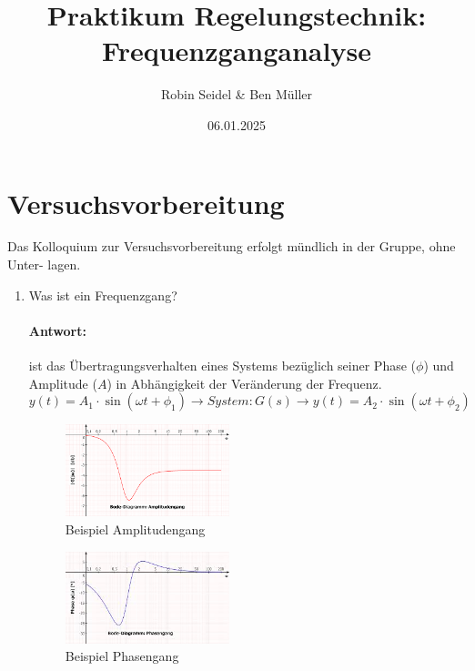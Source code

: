 \documentclass[12pt, a4paper]{article}
\title{\vspace{-0.5cm}Praktikum Regelungstechnik: Frequenzganganalyse\vspace{-0.5cm}}
\author{Robin Seidel \& Ben Müller}
\date{06.01.2025}
\begin{document}
\maketitle

\newpage
\section*{Versuchsvorbereitung}
Das Kolloquium zur Versuchsvorbereitung erfolgt mündlich in der Gruppe, ohne Unter-
lagen.

\begin{enumerate}
    \item Was ist ein Frequenzgang?
    \vspace{-16pt}\paragraph{Antwort:} ist das Übertragungsverhalten eines Systems bezüglich seiner Phase ($\phi$) und Amplitude ($A$) in Abhängigkeit der Veränderung der Frequenz.
    \[ y(t) = A_{1} \cdot \sin(\omega t + \phi_{1})  \rightarrow System: G(s) \rightarrow y(t) = A_{2} \cdot \sin(\omega t + \phi_{2})\]
    \begin{paracol}{2}
        \begin{figure}[H]
            \centering
            \includegraphics[width=0.45\textwidth]{amplitudengang.png}
            \caption{Beispiel Amplitudengang}
        \end{figure}
    \switchcolumn
        \begin{figure}[H]
            \centering
            \includegraphics[width=0.45\textwidth]{phasengang.jpg}
            \caption{Beispiel Phasengang}
        \end{figure}
    \end{paracol}


\end{enumerate}
\end{document}
